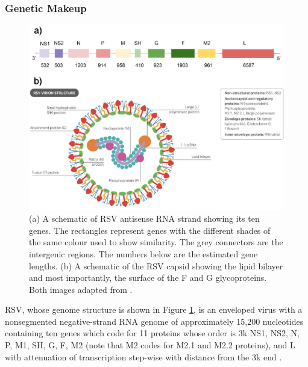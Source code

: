 \documentclass[10pt, a4paper]{article}
\begin{document}
\newpage

\subsubsection{Genetic Makeup}
\label{sec:org8b11c8c}
\begin{figure}[h!]
\centering
\includegraphics[width=1.0\textwidth]{../Figures/Schematic of RSV.png}
\caption[RSV Capsid]{\label{fig:orgb413091}(a) A schematic of RSV antisense RNA strand showing its ten genes. The rectangles represent genes with the different shades of the same colour used to show similarity. The grey connectors are the intergenic regions. The numbers below are the estimated gene lengths. (b) A schematic of the RSV capsid showing the lipid bilayer and most importantly, the surface of the F and G glycoproteins. Both images adapted from \cite{namRespiratorySyncytialVirus2019}.}
\end{figure}

RSV, whose genome structure is shown in Figure \ref{fig:orgb413091}, is an enveloped virus with a
nonsegmented negative-strand RNA genome of approximately 15,200 nucleotides
containing ten genes which code for 11 proteins whose order is 3k NS1, NS2, N,
P, M1, SH, G, F, M2 (note that M2 codes for M2.1 and M2.2 proteins), and L with
attenuation of transcription step-wise with distance from the 3k end
\cite{caneMolecularEpidemiologyRespiratory2001}.
\end{document}
